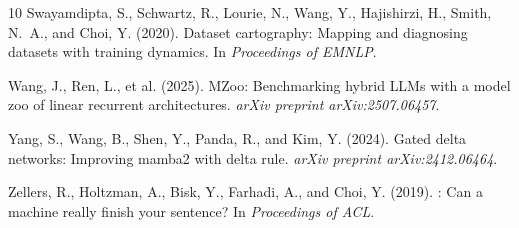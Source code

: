 \documentclass[11pt,a4paper]{article}
\begin{document}
\begin{thebibliography}{10}
Swayamdipta, S., Schwartz, R., Lourie, N., Wang, Y., Hajishirzi, H., Smith, N.~A., and Choi, Y. (2020).
\newblock Dataset cartography: Mapping and diagnosing datasets with training dynamics.
\newblock In \emph{Proceedings of EMNLP}.

Wang, J., Ren, L., et al. (2025).
\newblock MZoo: Benchmarking hybrid {LLM}s with a model zoo of linear recurrent architectures.
\newblock \emph{arXiv preprint arXiv:2507.06457}.

Yang, S., Wang, B., Shen, Y., Panda, R., and Kim, Y. (2024).
\newblock Gated delta networks: Improving mamba2 with delta rule.
\newblock \emph{arXiv preprint arXiv:2412.06464}.

Zellers, R., Holtzman, A., Bisk, Y., Farhadi, A., and Choi, Y. (2019).
: Can a machine really finish your sentence?
\newblock In \emph{Proceedings of ACL}.

\end{thebibliography}
\end{document}
